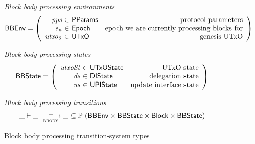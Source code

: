 \documentclass[11pt,a4paper]{article}
\newcommand{\powerset}[1]{\mathbb{P}~#1}
\newcommand{\var}[1]{\mathit{#1}}
\newcommand{\type}[1]{\mathsf{#1}}
\newcommand{\trans}[2]{\xlongrightarrow[\textsc{#1}]{#2}}
\newcommand{\Block}{\type{Block}}
\newcommand{\ProtParams}{\type{PParams}} %
\begin{document}
\begin{figure}[ht]
  \emph{Block body processing environments}
  \begin{equation*}
    \BBEnv =
    \left(
      \begin{array}{r@{~\in~}lr}
        \var{pps} & \ProtParams & \text{protocol parameters} \\
        \var{e_n} & \Epoch & \text{epoch we are currently processing blocks for} \\
        \var{utxo_0} & \UTxO & \text{genesis UTxO}
      \end{array}
    \right)
  \end{equation*}

  \emph{Block body processing states}
  \begin{equation*}
    \BBState =
    \left(
      \begin{array}{r@{~\in~}lr}
        \var{utxoSt} & \UTxOState & \text{UTxO state} \\
        \var{ds} & \DIState & \text{delegation state} \\
        \var{us} & \UPIState & \text{update interface state}
      \end{array}
    \right)
  \end{equation*}

  \emph{Block body processing transitions}
  \begin{equation*}
    \_ \vdash \var{\_} \trans{bbody}{\_} \var{\_} \subseteq
    \powerset (\BBEnv \times \BBState \times \Block \times \BBState)
  \end{equation*}
  \caption{Block body processing transition-system types}
  \label{fig:ts-types:bbody}
\end{figure}
\end{document}
